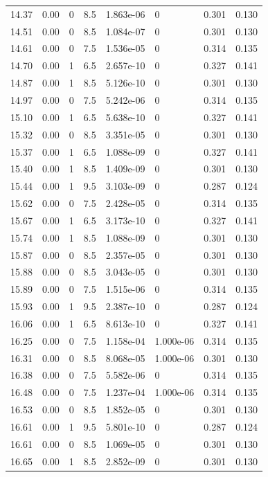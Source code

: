 \documentclass[preview]{standalone}
\begin{document}
{{{{\begin{tabular}{L{1.2cm}C{1.2cm} C{0.3cm}C{0.5cm} C{1.4cm}C{1.4cm} C{1.4cm}C{1.4cm}}
  14.37  &  0.00  & 0     & 8.5 &  1.863e-06  & 0  & 0.301 &  0.130   \\ 
  14.51  &  0.00  & 0     & 8.5 &  1.084e-07  & 0  & 0.301 &  0.130   \\ 
  14.61  &  0.00  & 0     & 7.5 &  1.536e-05  & 0  & 0.314 &  0.135   \\ 
  14.70  &  0.00  & 1     & 6.5 &  2.657e-10  & 0  & 0.327 &  0.141   \\ 
  14.87  &  0.00  & 1     & 8.5 &  5.126e-10  & 0  & 0.301 &  0.130   \\ 
  14.97  &  0.00  & 0     & 7.5 &  5.242e-06  & 0  & 0.314 &  0.135   \\ 
  15.10  &  0.00  & 1     & 6.5 &  5.638e-10  & 0  & 0.327 &  0.141   \\ 
  15.32  &  0.00  & 0     & 8.5 &  3.351e-05  & 0  & 0.301 &  0.130   \\ 
  15.37  &  0.00  & 1     & 6.5 &  1.088e-09  & 0  & 0.327 &  0.141   \\ 
  15.40  &  0.00  & 1     & 8.5 &  1.409e-09  & 0  & 0.301 &  0.130   \\ 
  15.44  &  0.00  & 1     & 9.5 &  3.103e-09  & 0  & 0.287 &  0.124   \\ 
  15.62  &  0.00  & 0     & 7.5 &  2.428e-05  & 0  & 0.314 &  0.135   \\ 
  15.67  &  0.00  & 1     & 6.5 &  3.173e-10  & 0  & 0.327 &  0.141   \\ 
  15.74  &  0.00  & 1     & 8.5 &  1.088e-09  & 0  & 0.301 &  0.130   \\ 
  15.87  &  0.00  & 0     & 8.5 &  2.357e-05  & 0  & 0.301 &  0.130   \\ 
  15.88  &  0.00  & 0     & 8.5 &  3.043e-05  & 0  & 0.301 &  0.130   \\ 
  15.89  &  0.00  & 0     & 7.5 &  1.515e-06  & 0  & 0.314 &  0.135   \\ 
  15.93  &  0.00  & 1     & 9.5 &  2.387e-10  & 0  & 0.287 &  0.124   \\ 
  16.06  &  0.00  & 1     & 6.5 &  8.613e-10  & 0  & 0.327 &  0.141   \\ 
  16.25  &  0.00  & 0     & 7.5 &  1.158e-04  & 1.000e-06  & 0.314 &  0.135   \\ 
  16.31  &  0.00  & 0     & 8.5 &  8.068e-05  & 1.000e-06  & 0.301 &  0.130   \\ 
  16.38  &  0.00  & 0     & 7.5 &  5.582e-06  & 0  & 0.314 &  0.135   \\ 
  16.48  &  0.00  & 0     & 7.5 &  1.237e-04  & 1.000e-06  & 0.314 &  0.135   \\ 
  16.53  &  0.00  & 0     & 8.5 &  1.852e-05  & 0  & 0.301 &  0.130   \\ 
  16.61  &  0.00  & 1     & 9.5 &  5.801e-10  & 0  & 0.287 &  0.124   \\ 
  16.61  &  0.00  & 0     & 8.5 &  1.069e-05  & 0  & 0.301 &  0.130   \\ 
  16.65  &  0.00  & 1     & 8.5 &  2.852e-09  & 0  & 0.301 &  0.130   \\ 
\hline 
\end{tabular} 

}}}}
\end{document}
